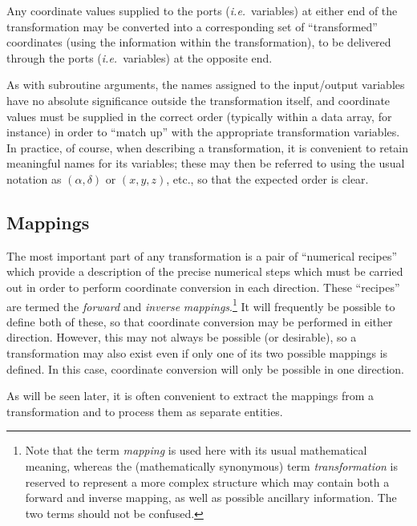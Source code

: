 \documentclass[twoside,11pt]{article}
\newcommand{\xlabel}[1]{}
\renewcommand{\_}{\texttt{\symbol{95}}}
\begin{document}
Any coordinate values supplied to the ports (\emph{i.e.}\ variables) at
either end of the transformation may be converted into a corresponding set
of ``transformed'' coordinates (using the information within the
transformation), to be delivered through the ports (\emph{i.e.}\ variables)
at the opposite end.

As with subroutine arguments, the names assigned to the input/output
variables have no absolute significance outside the transformation itself,
and coordinate values must be supplied in the correct order (typically
within a data array, for instance) in order to ``match up'' with the
appropriate transformation variables.
In practice, of course, when describing a transformation, it is convenient
to retain meaningful names for its variables; these may then be referred to
using the usual notation as \mbox{$(\alpha,\delta)$} or \mbox{$(x,y,z)$},
etc., so that the expected order is clear.

\subsection{\xlabel{mappings}Mappings}

The most important part of any transformation is a pair of ``numerical
recipes'' which provide a description of the precise numerical steps which
must be carried out in order to perform coordinate conversion in each
direction.
These ``recipes'' are termed the \emph{forward} and \emph{inverse}
\emph{mappings}.\footnote{
Note that the term \emph{mapping} is used here with its usual mathematical
meaning, whereas the (mathematically synonymous) term \emph{transformation}
is reserved to represent a more complex structure which may contain both a
forward and inverse mapping, as well as possible ancillary information.
The two terms should not be confused.}
It will frequently be possible to define both of these, so that coordinate
conversion may be performed in either direction.
However, this may not always be possible (or desirable), so a transformation
may also exist even if only one of its two possible mappings is defined.
In this case, coordinate conversion will only be possible in one direction.

As will be seen later, it is often convenient to extract the mappings from
a transformation and to process them as separate entities.
\end{document}
